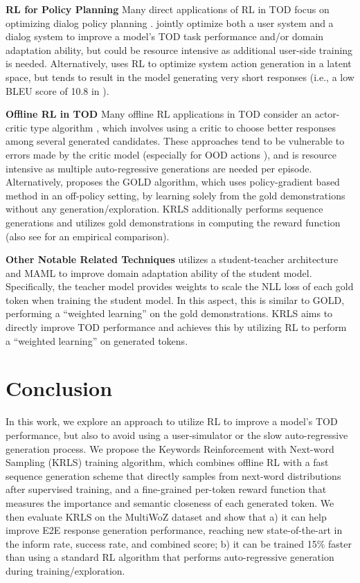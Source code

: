 \textbf{RL for Policy Planning}
Many direct applications of RL in TOD focus on optimizing dialog policy planning \cite{multiagent-nlp, jotus, lava}. \citet{multiagent-nlp, jotus} jointly optimize both a user system and a dialog system to improve a model's TOD task performance and/or domain adaptation ability, but could be resource intensive as additional user-side training is needed.
Alternatively, \citet{lava, rethink_action} uses RL to optimize system action generation in a latent space, but tends to result in the model generating very short responses (i.e., a low BLEU score of 10.8 in ). 

\textbf{Offline RL in TOD}
Many offline RL applications in TOD consider an actor-critic type algorithm \cite{gptcritic, chai}, which involves using a critic to choose better responses among several generated candidates. These approaches tend to be vulnerable to errors made by the critic model (especially for OOD actions \cite{offline-rl-overview}), and is resource intensive as multiple auto-regressive generations are needed per episode.
Alternatively, \citet{GOLD} proposes the GOLD algorithm, which uses policy-gradient based method in an off-policy setting, by learning solely from the gold demonstrations without any generation/exploration. KRLS additionally performs sequence generations and utilizes gold demonstrations in computing the reward function (also see  for an empirical comparison). 

\textbf{Other Notable Related Techniques} 
\citet{kun-meta-learning} utilizes a student-teacher architecture and MAML \cite{MAML} to improve domain adaptation ability of the student model. Specifically, the teacher model provides weights to scale the NLL loss of each gold token when training the student model. In this aspect, this is similar to GOLD, performing a ``weighted learning'' on the gold demonstrations. KRLS aims to directly improve TOD performance and achieves this by utilizing RL to perform a ``weighted learning'' on generated tokens.

\section{Conclusion}
\label{sec:Conclusion}
In this work, we explore an approach to utilize RL to improve a model's TOD performance, but also to avoid using a user-simulator or the slow auto-regressive generation process. 
We propose the Keywords Reinforcement with Next-word Sampling (KRLS) training algorithm, which combines offline RL with a fast sequence generation scheme that directly samples from next-word distributions after supervised training, and a fine-grained per-token reward function that measures the importance and semantic closeness of each generated token. We then evaluate KRLS on the MultiWoZ dataset and show that a) it can help improve E2E response generation performance, reaching new state-of-the-art in the inform rate, success rate, and combined score; b) it can be trained 15\% faster than using a standard RL algorithm that performs auto-regressive generation during training/exploration.
